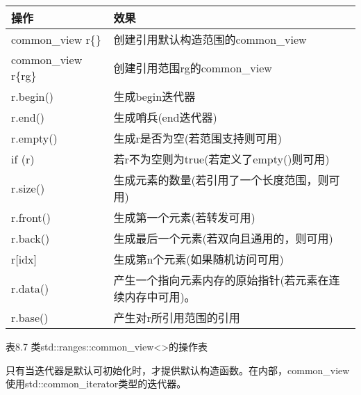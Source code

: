 \begin{longtable}[c]{|l|l|}
\hline
\textbf{操作}   & \textbf{效果}                                                \\ \hline
\endfirsthead
%
\endhead
%
common\_view r\{\} & 创建引用默认构造范围的common\_view                                   \\ \hline
common\_view r\{rg\} & 创建引用范围rg的common\_view                 \\ \hline
r.begin()            & 生成begin迭代器                                      \\ \hline
r.end()              & 生成哨兵(end迭代器)                              \\ \hline
r.empty()            & 生成r是否为空(若范围支持则可用) \\ \hline
if (r)               & 若r不为空则为true(若定义了empty()则可用)        \\ \hline
r.size()           & 生成元素的数量(若引用了一个长度范围，则可用)                            \\ \hline
r.front()            & 生成第一个元素(若转发可用)              \\ \hline
r.back()             & 生成最后一个元素(若双向且通用的，则可用)  \\ \hline
r{[}idx{]}           & 生成第n个元素(如果随机访问可用)            \\ \hline
r.data()           & 产生一个指向元素内存的原始指针(若元素在连续内存中可用)。 \\ \hline
r.base()             & 产生对r所引用范围的引用               \\ \hline
\end{longtable}

\begin{center}
表8.7 类std::ranges::common\_view<>的操作表
\end{center}

只有当迭代器是默认可初始化时，才提供默认构造函数。在内部，common\_view使用std::common\_iterator类型的迭代器。

